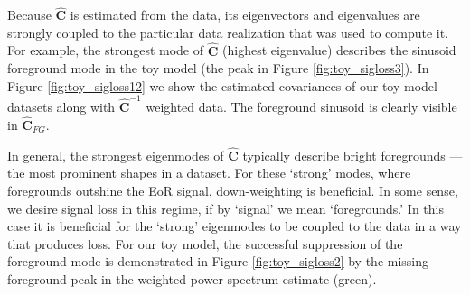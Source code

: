 \documentclass[preprint2,numberedappendix,tighten]{aastex6}  %
\begin{document}
Because $\widehat{\textbf{C}}$ is estimated from the data, its eigenvectors and eigenvalues are strongly coupled to the particular data realization that was used to compute it. For example, the strongest mode of $\widehat{\textbf{C}}$ (highest eigenvalue) describes the sinusoid foreground mode in the toy model (the peak in Figure \ref{fig:toy_sigloss3}). In Figure \ref{fig:toy_sigloss12} we show the estimated covariances of our toy model datasets along with $\widehat{\textbf{C}}^{-1}$ weighted data. The foreground sinusoid is clearly visible in $\widehat{\textbf{C}}_{FG}$.

In general, the strongest eigenmodes of $\widehat{\textbf{C}}$ typically describe bright foregrounds --- the most prominent shapes in a dataset. For these `strong' modes, where foregrounds outshine the EoR signal, down-weighting is beneficial. In some sense, we desire signal loss in this regime, if by `signal' we mean `foregrounds.' In this case it is beneficial for the `strong' eigenmodes to be coupled to the data in a way that produces loss. For our toy model, the successful suppression of the foreground mode is demonstrated in Figure \ref{fig:toy_sigloss2} by the missing foreground peak in the weighted power spectrum estimate (green).

\end{document}
